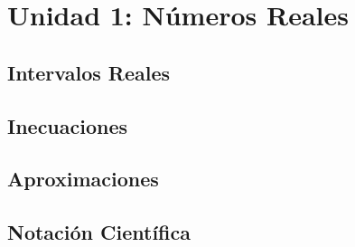 \section{Unidad 1: Números Reales}

\cite{RANDOMCITE}

\subsection{Intervalos Reales}



\subsection{Inecuaciones}

\subsection{Aproximaciones}

\subsection{Notación Científica}


